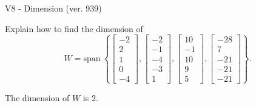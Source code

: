 \begin{exercise}
  \begin{exerciseTitle}V8 - Dimension (ver. 939)\end{exerciseTitle}
  \begin{exerciseStatement}
    Explain how to find the dimension of 
\[W=\mathrm{span}\ \left\{\left[\begin{array}{r}
-2 \\
2 \\
1 \\
0 \\
-4
\end{array}\right] , \left[\begin{array}{r}
-2 \\
-1 \\
-4 \\
-3 \\
1
\end{array}\right] , \left[\begin{array}{r}
10 \\
-1 \\
10 \\
9 \\
5
\end{array}\right] , \left[\begin{array}{r}
-28 \\
7 \\
-21 \\
-21 \\
-21
\end{array}\right]\right\}.\]



  \end{exerciseStatement}
  \begin{exerciseAnswer}
   The dimension of \(W\) is  \(2\).
  


  \end{exerciseAnswer}
\end{exercise}